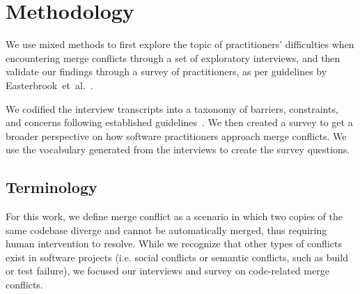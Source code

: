 \section{Methodology}\label{methodology}

We use mixed methods to first explore the topic of practitioners' difficulties when encountering merge conflicts through a set of exploratory interviews, and then validate our findings through a survey of practitioners, as per guidelines by \mbox{Easterbrook et al.}~\cite{easterbrook2008selecting}.

We codified the interview transcripts into a taxonomy of barriers, constraints, and concerns following established guidelines~\cite{latoza2006maintaining, shull2008guide, tao2012software}. We then created a survey to get a broader perspective on how software practitioners approach merge conflicts. We use the vocabulary generated from the interviews to create the survey questions.

\subsection{Terminology}\label{terminology_methods}
For this work, we define merge conflict as a scenario in which two copies of the same codebase diverge and cannot be automatically merged, thus requiring human intervention to resolve. 
While we recognize that other types of conflicts exist in software projects (i.e. social conflicts or semantic conflicts, such as build or test failure), we focused our interviews and survey on code-related merge conflicts.

